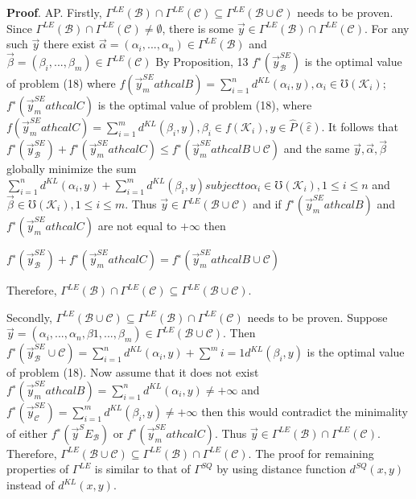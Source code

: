 \documentclass[10pt,a4paper]{IOS-Book-Article}
\begin{document}
\textbf{Proof}. AP. Firstly, $\Gamma^{LE}(\mathcal{B}) \cap \Gamma^{LE}(\mathcal{C}) \subseteq \Gamma^{LE}(\mathcal{B} \cup \mathcal{C})$
needs to be proven. Since $\Gamma^{LE}(\mathcal{B}) \cap \Gamma^{LE}(\mathcal{C}) \neq \emptyset$,
there is some $\vec{y} \in \Gamma^{LE}(\mathcal{B}) \cap \Gamma^{LE}(\mathcal{C})$. For any
such $\vec{y}$ there exist $\vec{\alpha} = (\alpha_i, ... , \alpha_n) \in \Gamma^{LE}(\mathcal{B})$
and $\vec{\beta} = (\beta_i, ... , \beta_m) \in \Gamma^{LE}(\mathcal{C})$ By Proposition,
13 $f^∗(\vec{y}^{SE}_\mathcal{B} )$ is the optimal value of problem
(18) where $f (\vec{y}^{SE}_mathcal{B} ) = \sum^n_{i=1} d^{KL}(\alpha_i, y), \alpha_i \in \mho(\mathcal{K}_i)$;
$f^∗(\vec{y}^{SE}_mathcal{C} )$ is the optimal value of problem (18),
where $f (\vec{y}^{SE}_mathcal{C} ) = \sum^m_{i=1} d^{KL}(\beta_i, y), \beta_i \in f(\mathcal{K}_i), y \in	
\widehat{P}(\hat{\varepsilon})$. It follows that $f^∗(\vec{y}^{SE}_\mathcal{B} ) + f^∗(\vec{y}^{SE}_mathcal{C} ) \leq f^∗(\vec{y}^{SE}_mathcal{B}\cup\mathcal{C})$
and the same $\vec{y}, \vec{\alpha}, \vec{\beta}$ globally minimize the sum $\sum^n_{i=1} d^{KL}(\alpha_i, y) +\sum^m_{i=1} d^{KL}(\beta_i, y) subject to \alpha_i \in
\mho(\mathcal{K}_i), 1 \leq i \leq n$ and $\vec{\beta} \in \mho(\mathcal{K}_i), 1 \leq i \leq m$. Thus
$\vec{y} \in \Gamma^{LE}(\mathcal{B} \cup \mathcal{C})$ and if $f^∗(\vec{y}^{SE}_mathcal{B} )$ and $f^∗(\vec{y}^{SE}_mathcal{C} )$ are not
equal to $+\infty$ then 

$f^∗(\vec{y}^{SE}_\mathcal{B} ) + f^∗(\vec{y}^{SE}_mathcal{C} ) = f^∗(\vec{y}^{SE}_mathcal{B}\cup\mathcal{C})$

Therefore, $\Gamma^{LE}(\mathcal{B}) \cap \Gamma^{LE}(\mathcal{C}) \subseteq \Gamma^{LE}(\mathcal{B} \cup \mathcal{C})$. 

Secondly, $\Gamma^{LE}(\mathcal{B} \cup \mathcal{C}) \subseteq \Gamma^{LE}(\mathcal{B}) \cap \Gamma^{LE}(\mathcal{C})$ needs
to be proven. Suppose $\vec{y} = (\alpha_i, ... , \alpha_n, \beta1, ... , \beta_m)
\in \Gamma^{LE}(\mathcal{B} \cup \mathcal{C})$.
Then $f^∗(\vec{y}^{SE}_\mathcal{B} \cup\mathcal{C}) = \sum^n_{i=1} d^{KL}(\alpha_i, y) + \sum^m{i=1} d^{KL}(\beta_i, y)$ is the optimal value of problem (18).
Now assume that it does not exist $f^∗(\vec{y}^{SE}_mathcal{B} ) = \sum^n_{i=1} d^{KL}(\alpha_i, y) \neq +\infty$ and $f^∗(\vec{y}^{SE}_\mathcal{C} ) = \sum^m_{i=1}
d^{KL}(\beta_i, y) \neq +\infty$ then this would contradict
the minimality of either $f^∗(\vec{y}^SE_\mathcal{B})$ or
$f^∗(\vec{y}^{SE}_mathcal{C} )$. Thus $\vec{y} \in \Gamma^{LE}(\mathcal{B}) \cap \Gamma^{LE}(\mathcal{C})$. Therefore,
$\Gamma^{LE}(\mathcal{B} \cup \mathcal{C}) \subseteq \Gamma^{LE}(\mathcal{B}) \cap \Gamma^{LE}(\mathcal{C})$.
The proof for remaining properties of $\Gamma^{LE}$ is similar to that of
$\Gamma^{SQ}$ by using distance function $d^{SQ}(x, y)$
instead of $d^{KL}(x, y)$.
\end{document}
